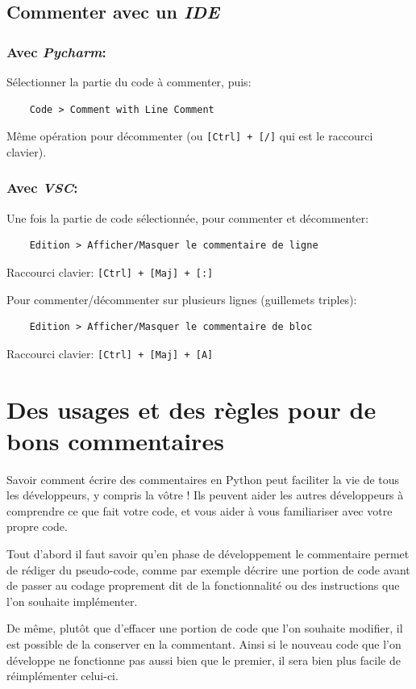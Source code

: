\documentclass[a4paper,12pt]{book}
\begin{document}
\subsection*{Commenter avec un \textit{IDE}}
\subsubsection*{Avec \textit{Pycharm}:}
Sélectionner la partie du code à commenter, puis:
\begin{verbatim}
    Code > Comment with Line Comment
\end{verbatim}
Même opération pour décommenter (ou \texttt{[Ctrl] + [/]} qui est le raccourci clavier).
\medskip

\subsubsection*{Avec \textit{VSC}:}
Une fois la partie de code sélectionnée, pour commenter et décommenter:
\begin{verbatim}
    Edition > Afficher/Masquer le commentaire de ligne
\end{verbatim}
Raccourci clavier: \texttt{[Ctrl] + [Maj] + [:]}
\medskip

Pour commenter/décommenter sur plusieurs lignes (guillemets triples):
\begin{verbatim}
    Edition > Afficher/Masquer le commentaire de bloc
\end{verbatim}
Raccourci clavier: \texttt{[Ctrl] + [Maj] + [A]}
\medskip

\section{Des usages et des règles pour de bons commentaires}
Savoir comment écrire des commentaires en Python peut faciliter la vie de tous les développeurs, y compris la vôtre ! Ils peuvent aider les autres développeurs à comprendre ce que fait votre code, et vous aider à vous familiariser avec votre propre code.
\medskip

Tout d'abord il faut savoir qu'en phase de développement le commentaire permet de rédiger du pseudo-code, comme par exemple décrire une portion de code avant de passer au codage proprement dit de la fonctionnalité ou des instructions que l'on souhaite implémenter.
\medskip

De même, plutôt que d'effacer une portion de code que l'on souhaite modifier, il est possible de la conserver en la commentant. Ainsi si le nouveau code que l'on développe ne fonctionne pas aussi bien que le premier, il sera bien plus facile de réimplémenter celui-ci.
\medskip
\end{document}
